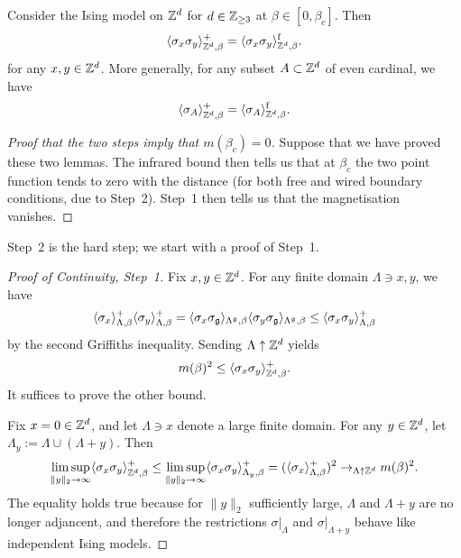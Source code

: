 \begin{lemma}
    Consider the Ising model on $\mathbb Z^d$ for $d\in\mathbb Z_{\geq 3}$ at $\beta\in[0,\beta_c]$.
    Then
    \[
        \langle\sigma_x\sigma_y\rangle_{\mathbb Z^d,\beta}^+
        =
        \langle\sigma_x\sigma_y\rangle_{\mathbb Z^d,\beta}^{\operatorname{f}}.
    \]
    for any $x,y\in\mathbb Z^d$.
    More generally, for any subset $A\subset\mathbb Z^d$ of even cardinal, we have 
    \[
        \langle\sigma_A\rangle_{\mathbb Z^d,\beta}^+
        =
        \langle\sigma_A\rangle_{\mathbb Z^d,\beta}^{\operatorname{f}}.
    \]
\end{lemma}

\begin{proof}[Proof that the two steps imply that $m(\beta_c)=0$]
    Suppose that we have proved these two lemmas.
    The infrared bound then tells us that at $\beta_c$ the two point function tends
    to zero with the distance (for both free and wired boundary conditions, due to Step~2).
    Step~1 then tells us that the magnetisation vanishes.    
\end{proof}

Step~2 is the hard step; we start with a proof of Step~1.

\begin{proof}[Proof of Continuity, Step~1]
    Fix $x,y\in\mathbb Z^d$.
    For any finite domain $\Lambda\ni x,y$,
    we have
    \[
        \langle\sigma_x\rangle_{\Lambda,\beta}^+
        \langle\sigma_y\rangle_{\Lambda,\beta}^+
        =
        \langle\sigma_x\sigma_\mathfrak g\rangle_{\Lambda^\mathfrak g,\beta}
        \langle\sigma_y\sigma_\mathfrak g\rangle_{\Lambda^\mathfrak g,\beta}
        \leq
        \langle\sigma_x\sigma_y\rangle_{\Lambda,\beta}^+
    \]
    by the second Griffiths inequality.
    Sending $\Lambda\uparrow\mathbb Z^d$ yields
    \[
        m(\beta)^2\leq \langle\sigma_x\sigma_y\rangle_{\mathbb Z^d,\beta}^+.
    \]
    It suffices to prove the other bound.

    Fix $x=0\in\mathbb Z^d$, and let $\Lambda\ni x$ denote a large finite domain.
    For any $y\in\mathbb Z^d$, let $\Lambda_y:=\Lambda\cup(\Lambda+y)$.
    Then
    \[
        \limsup_{\|y\|_2\to\infty}\langle\sigma_x\sigma_y\rangle_{\mathbb Z^d,\beta}^+
        \leq
        \limsup_{\|y\|_2\to\infty}\langle\sigma_x\sigma_y\rangle_{\Lambda_y,\beta}^+
        =
        (\langle\sigma_x\rangle_{\Lambda,\beta}^+)^2
        \to_{\Lambda\uparrow\mathbb Z^d}m(\beta)^2.
    \]
    The equality holds true because for $\|y\|_2$ sufficiently large,
    $\Lambda$ and $\Lambda+y$ are no longer adjancent,
    and therefore the restrictions $\sigma|_\Lambda$
    and $\sigma|_{\Lambda+y}$ behave like independent Ising models.
\end{proof}

